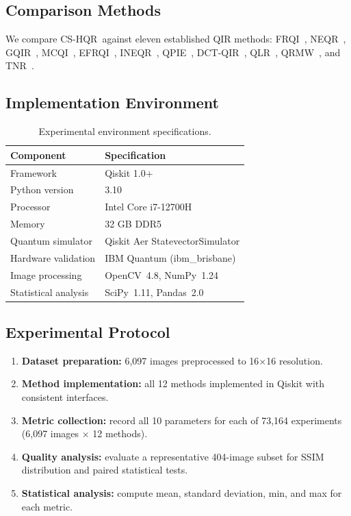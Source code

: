 \documentclass{ipol}
\newcommand{\cshqr}{\textsc{CS-HQR}}
\newcommand{\frqi}{\textsc{FRQI}}
\newcommand{\neqr}{\textsc{NEQR}}
\newcommand{\gqir}{\textsc{GQIR}}
\newcommand{\mcqi}{\textsc{MCQI}}
\begin{document}
\FloatBarrier
\subsection{Comparison Methods}

We compare \cshqr\ against eleven established QIR methods:
\frqi~\cite{ref3}, \neqr~\cite{ref4}, \gqir~\cite{ref18},
\mcqi~\cite{ref8}, EFRQI~\cite{ref32}, INEQR~\cite{ref33},
QPIE~\cite{ref24}, DCT-QIR~\cite{ref25}, QLR~\cite{ref19},
QRMW~\cite{ref34}, and TNR~\cite{ref41}.

\FloatBarrier
\subsection{Implementation Environment}

\begin{table}[H]
\begin{center}
\begin{tabular}{ll}
\hline
Component & Specification \\
\hline
Framework & Qiskit 1.0+~\cite{ref47} \\
Python version & 3.10 \\
Processor & Intel Core i7-12700H \\
Memory & 32 GB DDR5 \\
Quantum simulator & Qiskit Aer StatevectorSimulator \\
Hardware validation & IBM Quantum (ibm\_brisbane) \\
Image processing & OpenCV~4.8, NumPy~1.24 \\
Statistical analysis & SciPy~1.11, Pandas~2.0 \\
\hline
\end{tabular}
\caption{Experimental environment specifications.}
\label{tab:environment}
\end{center}
\end{table}

\FloatBarrier
\subsection{Experimental Protocol}

\begin{enumerate}
  \item \textbf{Dataset preparation:} 6,097 images preprocessed to
    16$\times$16 resolution.
  \item \textbf{Method implementation:} all 12 methods implemented in Qiskit
    with consistent interfaces.
  \item \textbf{Metric collection:} record all 10 parameters for each of
    73,164 experiments (6,097 images $\times$ 12 methods).
  \item \textbf{Quality analysis:} evaluate a representative 404-image subset
    for SSIM distribution and paired statistical tests.
  \item \textbf{Statistical analysis:} compute mean, standard deviation, min,
    and max for each metric.
\end{enumerate}
\end{document}
